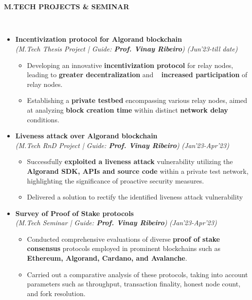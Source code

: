 \documentclass[a4paper,10pt]{article}
\newcommand{\resheading}[1]{{\small \colorbox{mygrey}{\begin{minipage}{0.99\textwidth}{\textbf{#1 \vphantom{p\^{E}}}}\end{minipage}}}}
\begin{document}
\hspace{0.1em}\\ %
\vspace{4.5cm} %
\\
\resheading{\textbf{M.TECH PROJECTS \& SEMINAR}}\\
\begin{itemize}[noitemsep,nolistsep]
\setlength\itemsep{0.3cm}
\item \textbf{Incentivization protocol for Algorand blockchain} \\
\emph{(M.Tech Thesis Project | Guide: \textbf{Prof. Vinay Ribeiro})} \hfill \emph{(Jun'23-till date)}
	\begin{itemize}[noitemsep,nolistsep]
    \item Developing an innovative  \textbf{incentivization protocol}  for relay nodes,  leading to\textbf{ greater decentralization} and \,\,\, \textbf{increased participation} of relay nodes.
    \item Establishing a \textbf{private testbed} encompassing various relay nodes, aimed at analyzing \textbf{block creation time} within distinct \textbf{network delay} conditions.
    \end{itemize}

\item \textbf{Liveness attack over Algorand blockchain} \\
\emph{(M.Tech RnD Project | Guide: \textbf{Prof. Vinay Ribeiro})} \hfill \emph{(Jan'23-Apr'23)}
	\begin{itemize}[noitemsep,nolistsep]
    \item Successfully \textbf{exploited a liveness attack} vulnerability utilizing the \textbf{Algorand SDK, APIs and source  code} within a private test network, highlighting the significance of proactive security measures.
    \item Delivered a solution to rectify the identified liveness attack vulnerability
    \end{itemize}

\item \textbf{Survey of Proof of Stake protocols} \\
\emph{(M.Tech Seminar | Guide: \textbf{Prof. Vinay Ribeiro})} \hfill \emph{(Jan'23-Apr'23)}
	\begin{itemize}[noitemsep,nolistsep]
    \item Conducted comprehensive evaluations of diverse \textbf{proof of stake consensus} protocols employed in prominent blockchains such as \textbf{Ethereum, Algorand, Cardano, and Avalanche}.
    \item Carried out a comparative analysis of these protocols, taking into account parameters such as throughput, transaction finality, honest node count, and fork resolution. 
    \\
	\end{itemize}
\end{itemize}
\end{document}
